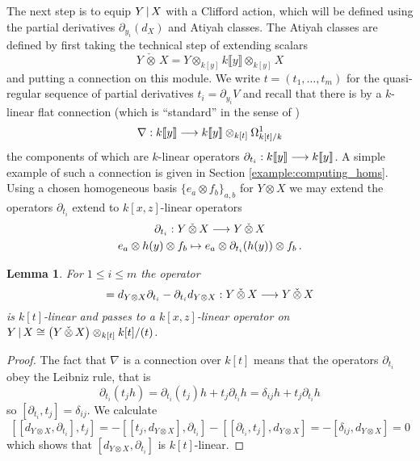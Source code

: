 \documentclass[english,letter paper,12pt,leqno]{article}
\newtheorem{lemma}[theorem]{Lemma}
\theoremstyle{example}
\numberwithin{equation}{section}
\def\be{\begin{equation}}
\def\ee{\end{equation}}
\begin{document}
The next step is to equip $Y \,|\, X$ with a Clifford action, which will be defined using the partial derivatives $\partial_{y_i}(d_X)$ and Atiyah classes. The Atiyah classes are defined by first taking the technical step of extending scalars
\begin{equation}\label{eq:completed_tensor_product}
Y \,\check{\otimes}\, X = Y \otimes_{k[y]} k\llbracket y \rrbracket \otimes_{k[y]} X
\end{equation}
and putting a connection on this module. We write $t = (t_1,\ldots,t_m)$ for the quasi-regular sequence of partial derivatives $t_i = \partial_{y_i} V$ and recall that there is by \cite[Appendix B]{dm1102.2957} a $k$-linear flat connection (which is ``standard'' in the sense of \cite[Definition 8.6]{dm1102.2957})
\begin{equation}\label{eq:connection_nabla}
\nabla: k\llbracket y \rrbracket \longrightarrow k\llbracket y \rrbracket \otimes_{k[t]} \Omega^1_{k[t]/k}
\end{equation}
the components of which are $k$-linear operators $\partial_{t_i}: k\llbracket y \rrbracket \longrightarrow k\llbracket y \rrbracket$. A simple example of such a connection is given in Section \ref{example:computing_homs}. Using a chosen homogeneous basis $\{ e_a \otimes f_b \}_{a,b}$ for $Y \otimes X$ we may extend the operators $\partial_{t_i}$ extend to $k[x,z]$-linear operators
\begin{gather*}
\partial_{t_i}: Y \, \check{\otimes}\, X \longrightarrow Y \, \check{\otimes}\, X\\
e_a \otimes h(y) \otimes f_b \mapsto e_a \otimes \partial_{t_i}( h(y) ) \otimes f_b\,.
\end{gather*}

\begin{lemma} For $1 \le i \le m$ the operator
\be
[ d_{Y \otimes X}, \partial_{t_i} ] = d_{Y \otimes X} \partial_{t_i} - \partial_{t_i} d_{Y \otimes X}: Y \, \check{\otimes}\, X \lto Y \, \check{\otimes}\, X
\ee
is $k[t]$-linear and passes to a $k[x,z]$-linear operator on $Y \,|\, X \cong \left( Y \, \check{\otimes}\, X \right) \otimes_{k[t]} k[t]/(t)$.
\end{lemma}
\begin{proof}
The fact that $\nabla$ is a connection over $k[t]$ means that the operators $\partial_{t_i}$ obey the Leibniz rule, that is
\[
\partial_{t_i}( t_j h ) = \partial_{t_i}( t_j ) h + t_j \partial_{t_i} h = \delta_{ij} h + t_j \partial_{t_i} h
\]
so $[ \partial_{t_i}, t_j ] = \delta_{ij}$. We calculate
\[
[[d_{Y \otimes X}, \partial_{t_i}], t_j] = - [[t_j, d_{Y \otimes X}], \partial_{t_i}] - [[\partial_{t_i}, t_j], d_{Y \otimes X}] = - [ \delta_{ij}, d_{Y \otimes X}] = 0
\]
which shows that $[d_{Y \otimes X}, \partial_{t_i}]$ is $k[t]$-linear.
\end{proof}
\end{document}
